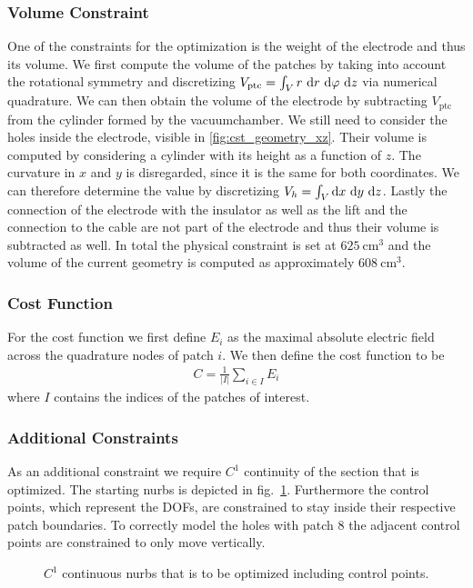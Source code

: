 \subsubsection{Volume Constraint}
One of the constraints for the optimization is the weight of the electrode and thus its volume.
We first compute the volume of the patches by taking into account the rotational symmetry and discretizing $V_{\mathrm{ptc}} = \int_V r\ \mathrm{d} r\ \mathrm{d} \varphi\ \mathrm{d} z$ via numerical quadrature. We can then obtain the volume of the electrode by subtracting $V_{\mathrm{ptc}}$ from the cylinder formed by the vacuumchamber.
We still need to consider the holes inside the electrode, visible in \ref{fig:cst_geometry_xz}. Their volume is computed by considering a cylinder with its height as a function of $z$. The curvature in $x$ and $y$ is disregarded, since it is the same for both coordinates. We can therefore determine the value by discretizing $V_{h} = \int_V \mathrm{d} x\ \mathrm{d} y\ \mathrm{d} z$.
Lastly the connection of the electrode with the insulator as well as the lift and the connection to the cable are not part of the electrode and thus their volume is subtracted as well.
In total the physical constraint is set at $625\ \mathrm{cm}^3$ and the volume of the current geometry is computed as approximately $608\ \mathrm{cm}^3$.

\subsubsection{Cost Function}
For the cost function we first define $E_i$ as the maximal absolute electric field across the quadrature nodes of patch $i$.
We then define the cost function to be
\begin{align}
   C = \frac{1}{|I|} \sum_{i \in I} E_i
\end{align}
where $I$ contains the indices of the patches of interest.

\subsubsection{Additional Constraints}
As an additional constraint we require $C^1$ continuity of the section that is optimized. The starting nurbs is depicted in fig.~\ref{fig:nurbs}. Furthermore the control points, which represent the DOFs, are constrained to stay inside their respective patch boundaries. To correctly model the holes with patch 8 the adjacent control points are constrained to only move vertically.

\begin{center}
\begin{figure}[H]
  
  \caption{$C^1$ continuous nurbs that is to be optimized including control points.}
  \label{fig:nurbs}
\end{figure}
\end{center}

